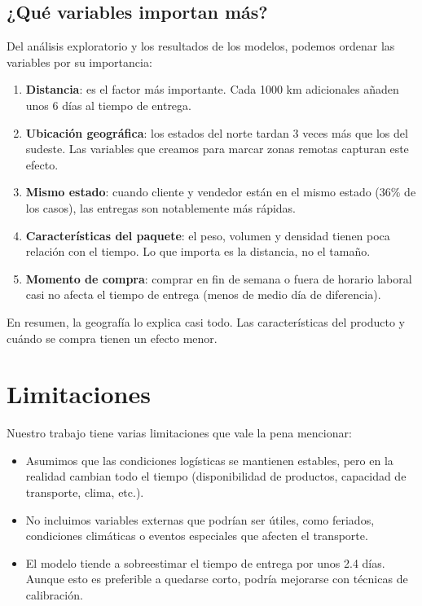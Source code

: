 \documentclass[journal]{IEEEtran}
\begin{document}
\subsection{¿Qué variables importan más?}

Del análisis exploratorio y los resultados de los modelos, podemos ordenar las variables por su importancia:
\begin{enumerate}
	\item \textbf{Distancia}: es el factor más importante. Cada 1000 km adicionales añaden unos 6 días al tiempo de entrega.
	\item \textbf{Ubicación geográfica}: los estados del norte tardan 3 veces más que los del sudeste. Las variables que creamos para marcar zonas remotas capturan este efecto.
	\item \textbf{Mismo estado}: cuando cliente y vendedor están en el mismo estado (36\% de los casos), las entregas son notablemente más rápidas.
	\item \textbf{Características del paquete}: el peso, volumen y densidad tienen poca relación con el tiempo. Lo que importa es la distancia, no el tamaño.
	\item \textbf{Momento de compra}: comprar en fin de semana o fuera de horario laboral casi no afecta el tiempo de entrega (menos de medio día de diferencia).
\end{enumerate}
En resumen, la geografía lo explica casi todo. Las características del producto y cuándo se compra tienen un efecto menor.

\section{Limitaciones}

Nuestro trabajo tiene varias limitaciones que vale la pena mencionar:
\begin{itemize}
	\item Asumimos que las condiciones logísticas se mantienen estables, pero en la realidad cambian todo el tiempo (disponibilidad de productos, capacidad de transporte, clima, etc.).
	\item No incluimos variables externas que podrían ser útiles, como feriados, condiciones climáticas o eventos especiales que afecten el transporte.
	\item El modelo tiende a sobreestimar el tiempo de entrega por unos 2.4 días. Aunque esto es preferible a quedarse corto, podría mejorarse con técnicas de calibración.
\end{itemize}
\end{document}
